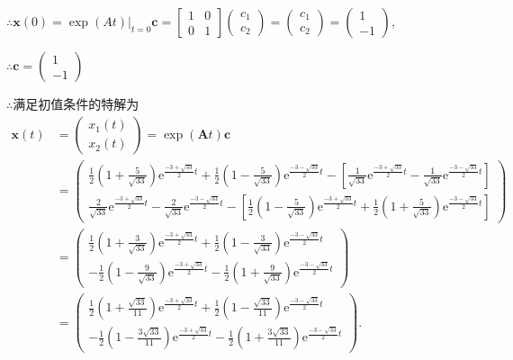 \documentclass[12pt,UTF8]{ctexart}
\newcommand{\me}[0]{\mathrm e}
\begin{document}
\begin{enumerate}
$\therefore\bm x(0)=\exp(At)|_{t=0}\bm c=\begin{bmatrix}
1&0\\
0&1
\end{bmatrix}\begin{pmatrix}c_1\\c_2\end{pmatrix}=\begin{pmatrix}c_1\\c_2\end{pmatrix}=\begin{pmatrix}1\\-1\end{pmatrix}$,

$\therefore\bm c=\begin{pmatrix}1\\-1\end{pmatrix}$

$\therefore$满足初值条件的特解为
\[\begin{aligned}
\bm x(t)&=\begin{pmatrix}x_1(t)\\x_2(t)\end{pmatrix}=\exp(\bm At)\bm c\\
&=\begin{pmatrix}
\frac12(1+\frac5{\sqrt{33}})\me^{\frac{-3+\sqrt{33}}2t}+\frac12(1-\frac5{\sqrt{33}})\me^{\frac{-3-\sqrt{33}}2t}-[\frac1{\sqrt{33}}\me^{\frac{-3+\sqrt{33}}2t}-\frac1{\sqrt{33}}\me^{\frac{-3-\sqrt{33}}2t}]\\
\frac2{\sqrt{33}}\me^{\frac{-3+\sqrt{33}}2t}-\frac2{\sqrt{33}}\me^{\frac{-3-\sqrt{33}}2t}-[\frac12(1-\frac5{\sqrt{33}})\me^{\frac{-3+\sqrt{33}}2t}+\frac12(1+\frac5{\sqrt{33}})\me^{\frac{-3-\sqrt{33}}2t}]
\end{pmatrix}\\
&=\begin{pmatrix}
\frac12(1+\frac3{\sqrt{33}})\me^{\frac{-3+\sqrt{33}}2t}+\frac12(1-\frac3{\sqrt{33}})\me^{\frac{-3-\sqrt{33}}2t}\\
-\frac12(1-\frac9{\sqrt{33}})\me^{\frac{-3+\sqrt{33}}2t}-\frac12(1+\frac9{\sqrt{33}})\me^{\frac{-3-\sqrt{33}}2t}
\end{pmatrix}\\
&=\begin{pmatrix}
\frac12(1+\frac{\sqrt{33}}{11})\me^{\frac{-3+\sqrt{33}}2t}+\frac12(1-\frac{\sqrt{33}}{11})\me^{\frac{-3-\sqrt{33}}2t}\\
-\frac12(1-\frac{3\sqrt{33}}{11})\me^{\frac{-3+\sqrt{33}}2t}-\frac12(1+\frac{3\sqrt{33}}{11})\me^{\frac{-3-\sqrt{33}}2t}
\end{pmatrix}.
\end{aligned}\]


\end{enumerate}
\end{document}
